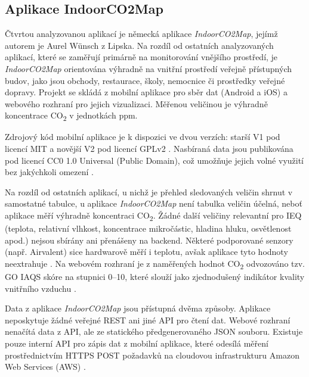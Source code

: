 \FloatBarrier
\subsection{Aplikace IndoorCO2Map}

Čtvrtou analyzovanou aplikací je německá aplikace \textit{IndoorCO2Map}, jejímž autorem je Aurel Wünsch z Lipska. Na rozdíl od ostatních analyzovaných aplikací, které se zaměřují primárně na monitorování vnějšího prostředí, je \textit{IndoorCO2Map} orientována výhradně na vnitřní prostředí veřejně přístupných budov, jako jsou obchody, restaurace, školy, nemocnice či prostředky veřejné dopravy. Projekt se skládá z mobilní aplikace pro sběr dat (Android a iOS) a webového rozhraní pro jejich vizualizaci. Měřenou veličinou je výhradně koncentrace CO\textsubscript{2} v jednotkách ppm. \parencite{IndoorCO2MapCO2Monitoring2024}

Zdrojový kód mobilní aplikace je k dispozici ve dvou verzích: starší V1 pod licencí MIT \parencite{aurelwuAurelWuIndoorCO2AppMAUI2026} a novější V2 pod licencí GPLv2 \parencite{aurelwuAurelWuIndoorCO2MapApp2026}. Nasbíraná data jsou publikována pod licencí CC0 1.0 Universal (Public Domain), což umožňuje jejich volné využití bez jakýchkoli omezení \parencite{zotero-item-571}.

Na rozdíl od ostatních aplikací, u nichž je přehled sledovaných veličin shrnut v samostatné tabulce, u aplikace \textit{IndoorCO2Map} není tabulka veličin účelná, neboť aplikace měří výhradně koncentraci CO\textsubscript{2}. Žádné další veličiny relevantní pro IEQ (teplota, relativní vlhkost, koncentrace mikročástic, hladina hluku, osvětlenost apod.) nejsou sbírány ani přenášeny na backend. Některé podporované senzory (např. Airvalent) sice hardwarově měří i teplotu, avšak aplikace tyto hodnoty neextrahuje \parencite{aurelwuAurelWuIndoorCO2MapApp2026}. Na webovém rozhraní je z naměřených hodnot CO\textsubscript{2} odvozováno tzv. GO IAQS skóre na stupnici 0--10, které slouží jako zjednodušený indikátor kvality vnitřního vzduchu \parencite{IndoorCO2Atlas}.

Data z aplikace \textit{IndoorCO2Map} jsou přístupná dvěma způsoby. Aplikace neposkytuje žádné veřejné REST ani jiné API pro čtení dat. Webové rozhraní nenačítá data z API, ale ze statického předgenerovaného JSON souboru. Existuje pouze interní API pro zápis dat z mobilní aplikace, které odesílá měření prostřednictvím HTTPS POST požadavků na cloudovou infrastrukturu Amazon Web Services (AWS) \parencite{aurelwuAurelWuIndoorCO2MapApp2026}.

